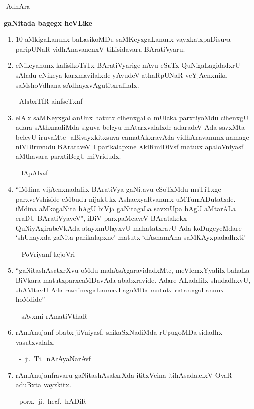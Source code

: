 \hfill{-AdhAra}

\begin{center}
{\bf gaNitada bagegx heVLike}
\end{center}
\begin{enumerate}[\rm 1]
\item {\rm 10} aMkigaLanunx baLasikoMDu saMKeyxgaLanunx vayxkatxpaDisuva paripUNaR vidhAna\-vanenxV tiLisidavaru BAratiVyaru.

\item eNikeyanunx kalisikoTaTx BAratiVyarige nAvu eSuTx QuNigaLagidadxrU sAladu eNikeya karxmavilalxde yAvudeV athaRpUNaR veYjAcnxnika saMshoVdhana sAdhayx\-vAgutitxralilalx.

~\hfill AlabxTfR ainfseTxnf

\item elAlx saMKeyxgaLanUnx hatutx cihenxgaLa mUlaka parxtiyoMdu cihenxgU adara sAthxnadiMda siguva beleyu mAtarxvalalxde adaradeV Ada savxMta beleyU iruvaMte -aBivayxkitxsuva camatAkxravAda vidhAnavanunx namage niVDiruvudu BArataveV I parikalapxne AkiRmiDiVsf matutx apaloVniyasf aMthavara parxtiBegU miVridudx.

~\hfill -lApAlxsf

\item ``iMdina vijAcnxnadalilx BAratiVya gaNitavu eSoTxMdu maTiTxge parxveVshiside eMbudu nijakUkx AshacxyaRvanunx uMTumADutatxde. iMdina aMkagaNita hAgU biVja gaNitagaLa savxrUpa hAgU aMtarALa eraDU BAratiVyaveV", iDiV parxpaMcaveV BAratakekx QuNiyAgirabeVkAda atayxmUlayxvU mahatatxravU Ada koDugeyeMdare `shUnayxda gaNita parikalapxne' matutx `dAshamAna saMKAyxpadadhxti'

~\hfill -PoVriyanf kejoVri

\item ``gaNitashAsatxrXvu oMdu mahAsAgaravidadxMte, meVlemxYyalilx bahaLa BiVkara matutx\break parxcaMDavAda ababxravide. Adare ALadalilx shudadhxvU, shAMtavU Ada rashimxgaLanonx\-LagoMDa mututx ratanxgaLanunx hoMdide''

~\hfill -sAvxmi rAmatiVthaR

\item rAmAnujanf obabx jiVniyasf, shikaSxNadiMda rUpugoMDa sidadhx vasutxvalalx. 

~\hfill -~ji.~Ti.~nArAyaNarAvf

\item rAmAnujanfravaru gaNitashAsatxrXda ititxVcina itihAsadalelxV OvaR aduBxta vayxkitx. 

~\hfill porx.~ji.~hecf.~hADiR 
\end{enumerate}
